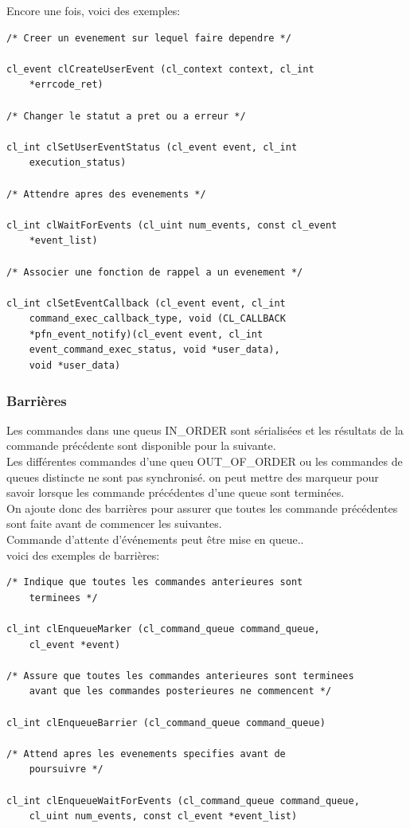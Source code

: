 \documentclass[oneside]{book}
\begin{document}
Encore une fois, voici des exemples:
\begin{lstlisting}
/* Creer un evenement sur lequel faire dependre */

cl_event clCreateUserEvent (cl_context context, cl_int
	*errcode_ret)

/* Changer le statut a pret ou a erreur */

cl_int clSetUserEventStatus (cl_event event, cl_int
	execution_status)

/* Attendre apres des evenements */

cl_int clWaitForEvents (cl_uint num_events, const cl_event
	*event_list)

/* Associer une fonction de rappel a un evenement */

cl_int clSetEventCallback (cl_event event, cl_int
	command_exec_callback_type, void (CL_CALLBACK
	*pfn_event_notify)(cl_event event, cl_int
	event_command_exec_status, void *user_data),
	void *user_data)
\end{lstlisting}

\subsubsection{Barrières}
Les commandes dans une queus IN\_ORDER sont sérialisées et les résultats de la commande précédente sont disponible pour la suivante.\\

Les différentes commandes d'une queu OUT\_OF\_ORDER ou les commandes de queues distincte ne sont pas synchronisé. on peut mettre des marqueur pour savoir lorsque les commande précédentes d'une queue sont terminées.\\

On ajoute donc des barrières pour assurer que toutes les commande précédentes sont faite avant de commencer les suivantes. \\

Commande d'attente d'événements peut être mise en queue..\\

voici des exemples de barrières:\\

\begin{lstlisting}
/* Indique que toutes les commandes anterieures sont
	terminees */

cl_int clEnqueueMarker (cl_command_queue command_queue,
	cl_event *event)

/* Assure que toutes les commandes anterieures sont terminees
	avant que les commandes posterieures ne commencent */

cl_int clEnqueueBarrier (cl_command_queue command_queue)

/* Attend apres les evenements specifies avant de
	poursuivre */

cl_int clEnqueueWaitForEvents (cl_command_queue command_queue,
	cl_uint num_events, const cl_event *event_list)
\end{lstlisting}
\end{document}
